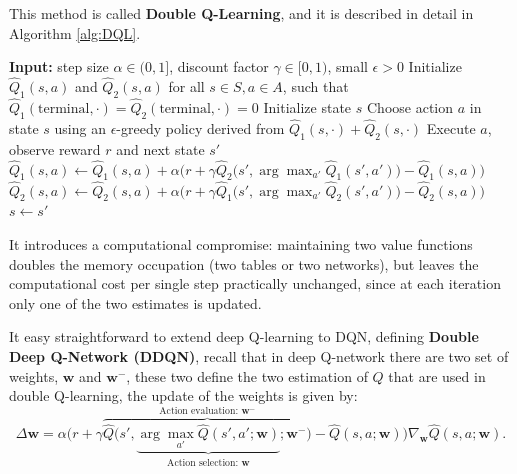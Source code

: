 \documentclass[10pt, a4paper]{report}
\begin{document}
This method is called \textbf{Double Q-Learning}, and it is described in detail in Algorithm \ref{alg:DQL}.
\begin{algorithm}[H]
\caption{Double Q-Learning}\label{alg:DQL}
\begin{algorithmic}[1]
    \State \textbf{Input:} step size $\alpha \in (0, 1]$, discount factor $\gamma \in [0, 1)$, small $\epsilon > 0$
    \State Initialize $\hat{Q}_1(s, a)$ and $\hat{Q}_2(s, a)$ for all $s \in S, a \in A$, such that $\hat{Q}_1(\text{terminal}, \cdot) = \hat{Q}_2(\text{terminal}, \cdot) = 0$
        \State Initialize state $s$
        \Repeat
            \State Choose action $a$ in state $s$ using an $\epsilon$-greedy policy derived from $\hat{Q}_1(s, \cdot) + \hat{Q}_2(s, \cdot)$
            \State Execute $a$, observe reward $r$ and next state $s'$
                \State $\hat{Q}_1(s, a) \leftarrow \hat{Q}_1(s, a) + \alpha \Big( r + \gamma \hat{Q}_2\big(s', \arg\max_{a'} \hat{Q}_1(s', a')\big) - \hat{Q}_1(s, a) \Big)$
            \Else
                \State $\hat{Q}_2(s, a) \leftarrow \hat{Q}_2(s, a) + \alpha \Big( r + \gamma \hat{Q}_1\big(s', \arg\max_{a'} \hat{Q}_2(s', a')\big) - \hat{Q}_2(s, a) \Big)$
            \EndIf
            \State $s \leftarrow s'$
    \EndFor
\end{algorithmic}
\end{algorithm}
It introduces a computational compromise: maintaining two value functions doubles the memory occupation (two tables or two networks), but leaves the computational cost per single step practically unchanged, since at each iteration only one of the two estimates is updated.\bigskip

It easy straightforward to extend deep Q-learning to DQN, defining \textbf{Double Deep Q-Network (DDQN)}, recall that in deep Q-network there are two set of weights, $\mathbf w$ and $\mathbf w^-$, these two define the two estimation of $Q$ that are used in double Q-learning, the update of the weights is given by:\begin{equation}
   \boxed{\Delta \mathbf{w} = \alpha \Big( r + \gamma \overbrace{\hat{Q}\big( s', \underbrace{\arg\max_{a'} \hat{Q}(s', a'; \mathbf{w})}_{\text{Action selection: } \mathbf{w}}; \mathbf{w}^- \big)}^{\text{Action evaluation: } \mathbf{w}^-} - \hat{Q}(s, a; \mathbf{w}) \Big) \nabla_{\mathbf{w}} \hat{Q}(s, a; \mathbf{w})}.
\end{equation}
\end{document}
